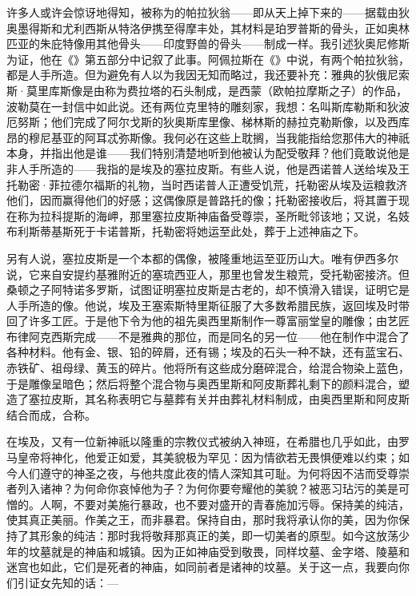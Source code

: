 许多人或许会惊讶地得知，被称为的帕拉狄翁——即从天上掉下来的——据载由狄奥墨得斯和尤利西斯从特洛伊携至得摩丰处，其材料是珀罗普斯的骨头，正如奥林匹亚的朱庇特像用其他骨头——印度野兽的骨头——制成一样。我引述狄奥尼修斯为证，他在《》第五部分中记叙了此事。阿佩拉斯在《》中说，有两个帕拉狄翁，都是人手所造。但为避免有人以为我因无知而略过，我还要补充：雅典的狄俄尼索斯·莫里库斯像是由称为费拉塔的石头制成，是西蒙（欧帕拉摩斯之子）的作品，波勒莫在一封信中如此说。还有两位克里特的雕刻家，我想：名叫斯库勒斯和狄波厄努斯；他们完成了阿尔戈斯的狄奥斯库里像、梯林斯的赫拉克勒斯像，以及西库昂的穆尼基亚的阿耳忒弥斯像。我何必在这些上耽搁，当我能指给您那伟大的神祇本身，并指出他是谁——我们特别清楚地听到他被认为配受敬拜？他们竟敢说他是非人手所造的——我指的是埃及的塞拉皮斯。有些人说，他是西诺普人送给埃及王托勒密·菲拉德尔福斯的礼物，当时西诺普人正遭受饥荒，托勒密从埃及运粮救济他们，因而赢得他们的好感；这偶像原是普路托的像；托勒密接收后，将其置于现在称为拉科提斯的海岬，那里塞拉皮斯神庙备受尊崇，圣所毗邻该地；又说，名妓布利斯蒂基斯死于卡诺普斯，托勒密将她运至此处，葬于上述神庙之下。\par

另有人说，塞拉皮斯是一个本都的偶像，被隆重地运至亚历山大。唯有伊西多尔说，它来自安提约基雅附近的塞琉西亚人，那里也曾发生粮荒，受托勒密接济。但桑顿之子阿特诺多罗斯，试图证明塞拉皮斯是古老的，却不慎滑入错误，证明它是人手所造的像。他说，埃及王塞索斯特里斯征服了大多数希腊民族，返回埃及时带回了许多工匠。于是他下令为他的祖先奥西里斯制作一尊富丽堂皇的雕像；由艺匠布律阿克西斯完成——不是雅典的那位，而是同名的另一位——他在制作中混合了各种材料。他有金、银、铅的碎屑，还有锡；埃及的石头一种不缺，还有蓝宝石、赤铁矿、祖母绿、黄玉的碎片。他将所有这些成分磨碎混合，给混合物染上蓝色，于是雕像呈暗色；然后将整个混合物与奥西里斯和阿皮斯葬礼剩下的颜料混合，塑造了塞拉皮斯，其名称表明它与墓葬有关并由葬礼材料制成，由奥西里斯和阿皮斯结合而成，合称。\par

在埃及，又有一位新神祇以隆重的宗教仪式被纳入神班，在希腊也几乎如此，由罗马皇帝将神化，他爱正如爱，其美貌极为罕见：因为情欲若无畏惧便难以约束；如今人们遵守的神圣之夜，与他共度此夜的情人深知其可耻。为何将因不洁而受尊崇者列入诸神？为何命你哀悼他为子？为何你要夸耀他的美貌？被恶习玷污的美是可憎的。人啊，不要对美施行暴政，也不要对盛开的青春施加污辱。保持美的纯洁，使其真正美丽。作美之王，而非暴君。保持自由，那时我将承认你的美，因为你保持了其形象的纯洁：那时我将敬拜那真正的美，即一切美者的原型。如今这放荡少年的坟墓就是的神庙和城镇。因为正如神庙受到敬畏，同样坟墓、金字塔、陵墓和迷宫也如此，它们是死者的神庙，如同前者是诸神的坟墓。关于这一点，我要向你们引证女先知的话：—\par

